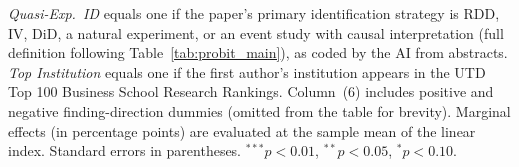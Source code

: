 \documentclass[12pt]{article}
\begin{document}
\begin{table}[H]
\begin{singlespace}
\begin{minipage}{\textwidth}
\textit{Quasi-Exp.\ ID} equals one if the paper's primary identification
strategy is RDD, IV, DiD, a natural experiment, or an event study with
causal interpretation (full definition following
Table~\ref{tab:probit_main}), as coded by the AI from abstracts.  \textit{Top Institution} equals one if the first
author's institution appears in the UTD Top 100 Business School Research
Rankings.  Column~(6) includes positive and negative finding-direction dummies
(omitted from the table for brevity).
Marginal effects (in percentage points) are evaluated at the
sample mean of the linear index.
Standard errors in parentheses.
$^{***}p<0.01$, $^{**}p<0.05$, $^{*}p<0.10$.
\end{minipage}
\end{singlespace}
\end{table}
\end{document}
